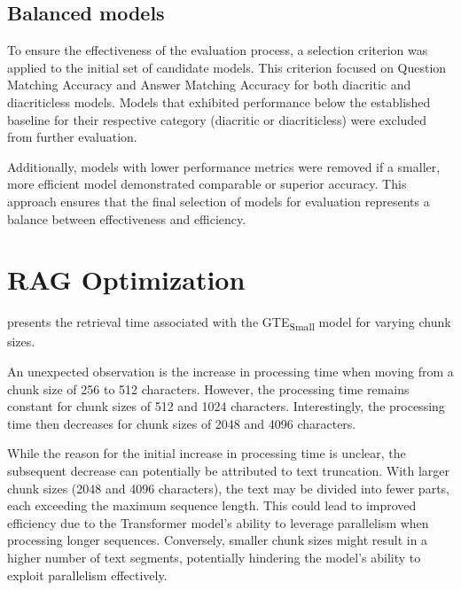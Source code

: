 \FloatBarrier



\FloatBarrier

\subsection{Balanced models}
To ensure the effectiveness of the evaluation process, a selection criterion was applied to the initial set of candidate models.
This criterion focused on Question Matching Accuracy and Answer Matching Accuracy for both diacritic and diacriticless models.
Models that exhibited performance below the established baseline for their respective category (diacritic or diacriticless) were excluded from further evaluation.

Additionally, models with lower performance metrics were removed if a smaller, more efficient model demonstrated comparable or superior accuracy.
This approach ensures that the final selection of models for evaluation represents a balance between effectiveness and efficiency.



\section{\ac{RAG} Optimization}

 presents the retrieval time associated with the \ac{GTE}\textsubscript{Small} model for varying chunk sizes.



An unexpected observation is the increase in processing time when moving from a chunk size of 256 to 512 characters.
However, the processing time remains constant for chunk sizes of 512 and 1024 characters.
Interestingly, the processing time then decreases for chunk sizes of 2048 and 4096 characters.

While the reason for the initial increase in processing time is unclear, the subsequent decrease can potentially be attributed to text truncation.
With larger chunk sizes (2048 and 4096 characters), the text may be divided into fewer parts, each exceeding the maximum sequence length.
This could lead to improved efficiency due to the Transformer model's ability to leverage parallelism when processing longer sequences.
Conversely, smaller chunk sizes might result in a higher number of text segments, potentially hindering the model's ability to exploit parallelism effectively.


